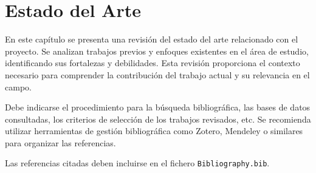 \chapter[Estado del Arte]{Estado del Arte}
\label{cp:state-of-the-art}

\noindent En este capítulo se presenta una revisión del estado del arte relacionado con el proyecto. Se analizan trabajos previos y enfoques existentes en el área de estudio, identificando sus fortalezas y debilidades. Esta revisión proporciona el contexto necesario para comprender la contribución del trabajo actual y su relevancia en el campo.

Debe indicarse el procedimiento para la búsqueda bibliográfica, las bases de datos consultadas, los criterios de selección de los trabajos revisados, etc. Se recomienda utilizar herramientas de gestión bibliográfica como Zotero, Mendeley o similares para organizar las referencias.

Las referencias citadas deben incluirse en el fichero \texttt{Bibliography.bib}.